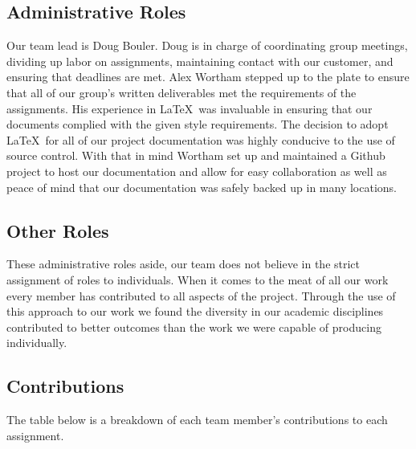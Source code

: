 \documentclass[11pt,letterpaper]{article}
\begin{document}
\subsection{Administrative Roles}
Our team lead is Doug Bouler. Doug is in charge of coordinating group
meetings, dividing up labor on assignments, maintaining contact with our
customer, and ensuring that deadlines are met.  Alex Wortham stepped up to the
plate to ensure that all of our group's written deliverables met the
requirements of the assignments.  His experience in \LaTeX\ was invaluable in
ensuring that our documents complied with the given style requirements.  The
decision to adopt \LaTeX\ for all of our project documentation was highly
conducive to the use of source control.  With that in mind Wortham set up and
maintained a Github project to host our documentation and allow for easy
collaboration as well as peace of mind that our documentation was safely backed
up in many locations.

\subsection{Other Roles}
These administrative roles aside, our team does not
believe in the strict assignment of roles to individuals.  When it comes to the
meat of all our work every member has contributed to all aspects of the project.
Through the use of this approach to our work we found the diversity in our
academic disciplines contributed to better outcomes than the work we were
capable of producing individually. 


\clearpage
\subsection{Contributions}
The table below is a breakdown of each team member's contributions to each assignment.
\end{document}
